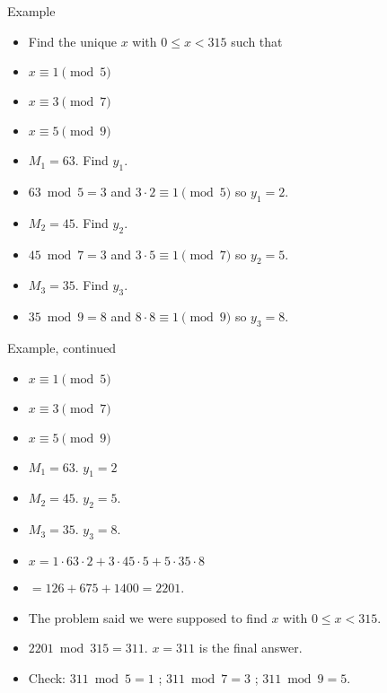 \documentclass[handout]{beamer}
\begin{document}
\begin{frame}{Example}

\begin{itemize}
  \item Find the unique $x$ with $0\leq x < 315$ such that
  \item $x \equiv 1 \pmod 5$
  \item $x \equiv 3 \pmod 7$
  \item $x \equiv 5 \pmod 9$
  \item $M_1 = 63$. Find $y_1$.
  \item $63 \bmod 5 = 3$ and $3\cdot 2 \equiv 1 \pmod 5$ so $y_1 = 2$.
  \item $M_2 = 45$. Find $y_2$.
  \item $45 \bmod 7 = 3$ and  $3 \cdot 5 \equiv 1 \pmod 7$ so  $y_2 = 5$.
  \item $M_3 = 35$. Find $y_3$.
  \item $35 \bmod 9 = 8$ and $8 \cdot 8 \equiv 1 \pmod 9$ so $y_3 = 8$.
\end{itemize}

\end{frame}

\begin{frame}{Example, continued}

\begin{itemize}
  \item $x \equiv 1 \pmod 5$
  \item $x \equiv 3 \pmod 7$
  \item $x \equiv 5 \pmod 9$
  \item $M_1 = 63$. $y_1 = 2$
  \item $M_2 = 45$. $y_2 = 5$.
  \item $M_3 = 35$. $y_3 = 8$.
  \item $x = 1 \cdot 63 \cdot 2 + 3 \cdot 45 \cdot 5 + 5 \cdot 35 \cdot 8 $
  \item $= 126 + 675 + 1400 = 2201$.
  \item The problem said we were supposed to find $x$ with $0\leq x < 315$.
  \item $2201\bmod 315 = 311$. $x=311$ is the final answer.
  \item Check: $311 \bmod 5 = 1$ ; $311 \bmod 7 = 3$ ; $311 \bmod 9 = 5$.
\end{itemize}

\end{frame}
\end{document}
